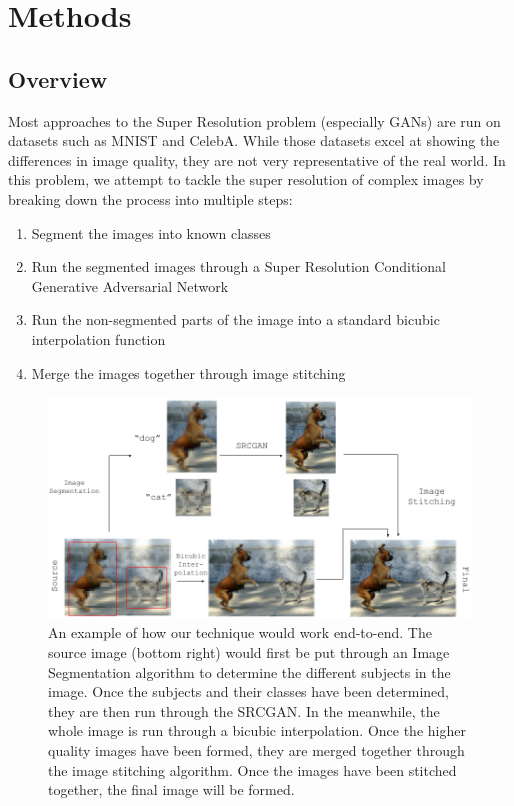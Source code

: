 \section{Methods}

\subsection{Overview}
Most approaches to the Super Resolution problem (especially GANs) are run on
datasets such as MNIST and CelebA. While those datasets excel at showing the
differences in image quality, they are not very representative of the real
world. In this problem, we attempt to tackle the super resolution of complex
images by breaking down the process into multiple steps:

\begin{enumerate}
	\item Segment the images into known classes
	\item Run the segmented images through a Super Resolution Conditional Generative Adversarial Network
	\item Run the non-segmented parts of the image into a standard bicubic interpolation function
	\item Merge the images together through image stitching

\end{enumerate}

\begin{figure}
	\centering
	\includegraphics[width=\textwidth]{images/intuition.png}
	\caption{An example of how our technique would work end-to-end. The source
	image (bottom right) would first be put through an Image Segmentation
	algorithm to determine the different subjects in the image. Once the subjects
	and their classes have been determined, they are then run through the SRCGAN.
	In the meanwhile, the whole image is run through a bicubic interpolation. Once
	the higher quality images have been formed, they are merged together through
	the image stitching algorithm. Once the images have been stitched together,
	the final image will be formed.}
	\label{fig:intuition}
\end{figure}

